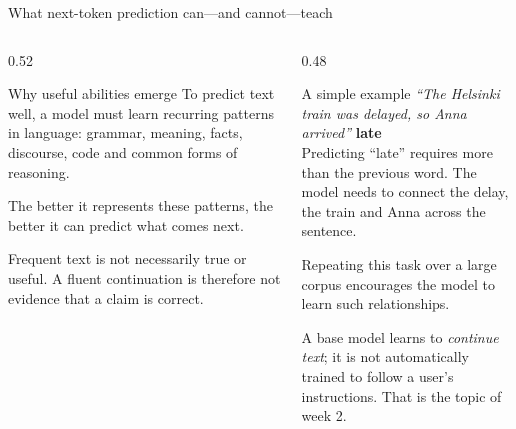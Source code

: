 \documentclass[aspectratio=169,10pt]{beamer}
\begin{document}
\begin{frame}{What next-token prediction can—and cannot—teach}
  \begin{columns}[T]
    \begin{column}{0.52\textwidth}
      \begin{block}{Why useful abilities emerge}
        To predict text well, a model must learn recurring patterns in
        language: grammar, meaning, facts, discourse, code and common forms of
        reasoning.
        \vspace{0.4em}

        The better it represents these patterns, the better it can predict
        what comes next.
      \end{block}
      \begin{gotcha}
        Frequent text is not necessarily true or useful. A fluent continuation
        is therefore not evidence that a claim is correct.
      \end{gotcha}
    \end{column}
    \begin{column}{0.48\textwidth}
      \begin{block}{A simple example}
        \footnotesize
        \textit{``The Helsinki train was delayed, so Anna arrived''}
        \textbf{\textcolor{UHBlue}{late}}\\[0.4em]
        Predicting ``late'' requires more than the previous word. The model
        needs to connect the delay, the train and Anna across the sentence.
        \vspace{0.4em}

        Repeating this task over a large corpus encourages the model to learn
        such relationships.
      \end{block}
      \small
      A base model learns to \emph{continue text}; it is not automatically
      trained to follow a user's instructions. That is the topic of week 2.
    \end{column}
  \end{columns}
\end{frame}
\end{document}
